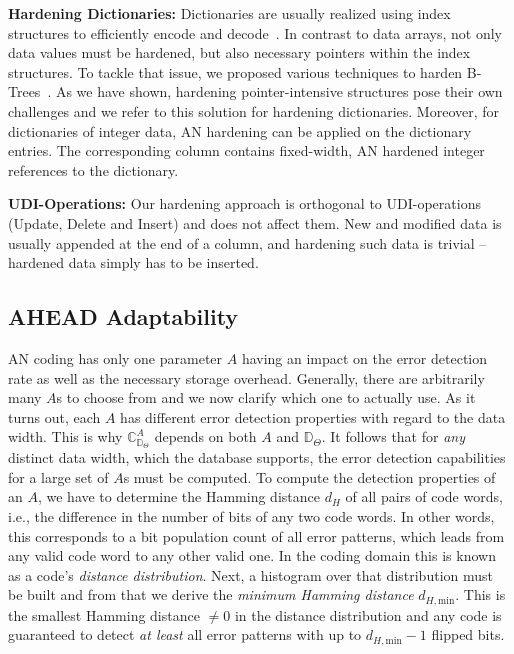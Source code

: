 \textbf{Hardening Dictionaries:}
Dictionaries are usually realized using index structures to efficiently encode and decode~\cite{DBLP:conf/sigmod/BinnigHF09}. In contrast to data arrays, not only data values must be hardened, but also necessary pointers within the index structures. To tackle that issue, we proposed various techniques to harden B-Trees~\cite{DBLP:conf/damon/KolditzKSHL14}. As we have shown, hardening pointer-intensive structures pose their own challenges and we refer to this solution for hardening dictionaries. Moreover, for dictionaries of integer data, AN hardening can be applied on the dictionary entries. The corresponding column contains fixed-width, AN hardened integer references to the dictionary.

\textbf{UDI-Operations:}
Our hardening approach is orthogonal to UDI-operations (Update, Delete and Insert) and does not affect them. New and modified data is usually appended at the end of a column, and hardening such data is trivial -- hardened data simply has to be inserted.


\subsection{AHEAD Adaptability}
\label{sec:Adapting}

AN coding has only one parameter \(A\) having an impact on the error detection rate as well as the necessary storage overhead. Generally, there are arbitrarily many \(A\)s to choose from and we now clarify which one to actually use. As it turns out, each \(A\) has different error detection properties with regard to the data width. This is why \(\mathbb{C}_{\mathbb{D}_\Theta}^A\) depends on both \(A\) and \(\mathbb{D}_\Theta\). It follows that for \emph{any} distinct data width, which the database supports, the error detection capabilities for a large set of \(A\)s must be computed. To compute the detection properties of an \(A\), we have to determine the Hamming distance \(d_H\) of all pairs of code words, i.e., the difference in the number of bits of any two code words. In other words, this corresponds to a bit population count of all error patterns, which leads from any valid code word to any other valid one. In the coding domain this is known as a code's \emph{distance distribution}. Next, a histogram over that distribution must be built and from that we derive the \emph{minimum Hamming distance} \(d_{H,\text{min}}\). This is the smallest Hamming distance \(\neq0\) in the distance distribution and any code is guaranteed to detect \emph{at least} all error patterns with up to \(d_{H,\text{min}}-1\) flipped bits.

